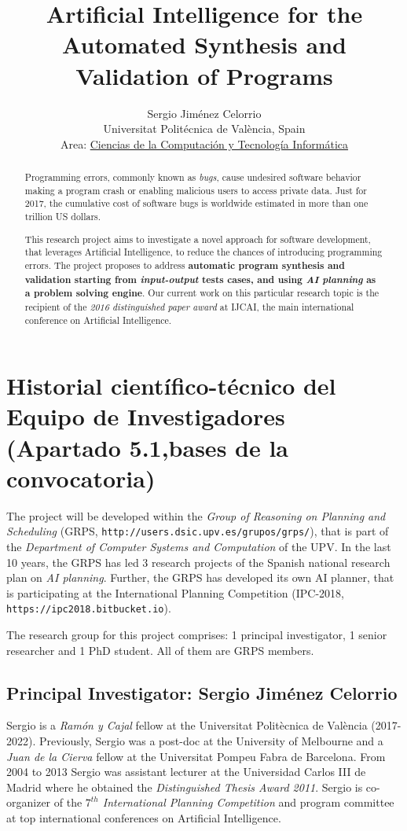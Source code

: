 \documentclass[10pt,a4paper]{paper}
\title{Artificial Intelligence for the Automated Synthesis and Validation of Programs}
\author{Sergio Jim\'enez Celorrio\\
\footnotesize Universitat Politécnica de València, Spain\\
\small Area: \underline{Ciencias de la Computación y Tecnología Informática}}
\begin{document}
\maketitle

\begin{abstract}
Programming errors, commonly known as {\em bugs}, cause undesired software behavior making a program crash or enabling malicious users to access private data. Just for 2017, the cumulative cost of software bugs is worldwide estimated in more than one trillion US dollars. 

This research project aims to investigate a novel approach for software development, that leverages Artificial Intelligence, to reduce the chances of introducing programming errors. The project proposes to address {\bf automatic program synthesis and validation starting from {\em input-output} tests cases, and using {\em AI planning} as a problem solving engine}. Our current work on this particular research topic is the recipient of the {\em 2016 distinguished paper award} at {\sc IJCAI}, the main international conference on Artificial Intelligence.
\end{abstract}

\newpage

\section{Historial científico-técnico del Equipo de Investigadores (Apartado 5.1,bases de la convocatoria)}

The project will be developed within the {\em Group of Reasoning on Planning and Scheduling} (GRPS, {\tt http://users.dsic.upv.es/grupos/grps/}), that is part of the {\em Department of Computer Systems and Computation} of the UPV. In the last 10 years, the GRPS has led 3 research projects of the Spanish national research plan on {\em AI planning}. Further, the GRPS has developed its own AI planner, that is participating  at the International Planning Competition (IPC-2018, {\tt https://ipc2018.bitbucket.io}).

The research group for this project comprises: 1 principal investigator, 1 senior researcher and 1 PhD student. All of them are GRPS members. 

\subsection{Principal Investigator: Sergio Jiménez Celorrio}
Sergio is a {\em Ramón y Cajal} fellow at the Universitat Politècnica de València (2017-2022). Previously, Sergio was a post-doc at the University of Melbourne and a {\em Juan de la Cierva} fellow at the Universitat Pompeu Fabra de Barcelona. From 2004 to 2013 Sergio was assistant lecturer at the Universidad Carlos III de Madrid where he obtained the {\em Distinguished Thesis Award 2011}. Sergio is co-organizer of the {\em $7^{th}$ International Planning Competition} and program committee at top international conferences on Artificial Intelligence.
\end{document}
